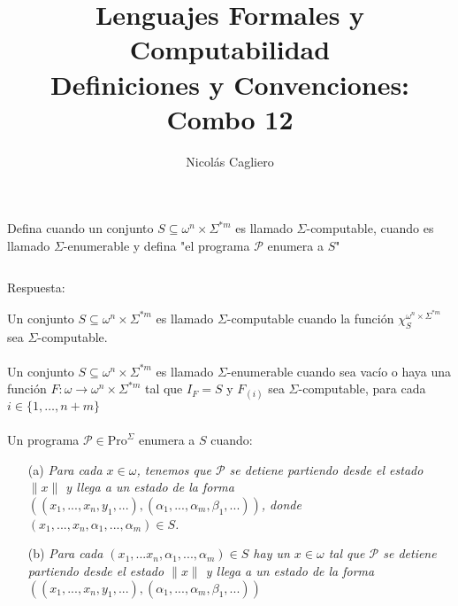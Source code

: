 \documentclass{article}
\title{Lenguajes Formales y Computabilidad \\
        \large Definiciones y Convenciones: Combo 12 }
\author{Nicolás Cagliero}
\begin{document}
\maketitle

Defina cuando un conjunto $S \subseteq \omega^n \times \Sigma^{*m}$ es llamado
$\Sigma$-computable, cuando es llamado $\Sigma$-enumerable y defina 
"el programa $\mathcal{P}$ enumera a $S$"

\(\)
\begin{center}
    Respuesta: 
    \(\)
\end{center}

Un conjunto $S \subseteq \omega^n \times \Sigma^{*m}$ es llamado
$\Sigma$-computable cuando la función $\chi_S^{\omega^n \times \Sigma^{*m}}$ sea $\Sigma$-computable.\\
\\

Un conjunto $S \subseteq \omega^n \times \Sigma^{*m}$ es llamado $\Sigma$-enumerable
cuando sea vacío o haya una función $F : \omega \rightarrow \omega^n \times \Sigma^{*m}$
tal que $I_F = S$ y $F_{(i)}$ sea $\Sigma$-computable, para cada $i \in \{1, \dots, n + m\}$\\
\\

Un programa $\mathcal{P} \in \text{Pro}^{\Sigma}$  enumera a $S$ cuando:
\begin{itemize}
  \item[(a)] \textit{Para cada $x \in \omega$, tenemos que $\mathcal{P}$ se detiene partiendo desde el estado $\|x\|$ y llega a un estado de la forma $((x_1, ..., x_n, y_1, ...), (\alpha_1, ..., \alpha_m, \beta_1, ...))$, donde $(x_1, ..., x_n, \alpha_1, ..., \alpha_m) \in S$.}
  
  \item[(b)] \textit{Para cada $(x_1, ... x_n, \alpha_1, ..., \alpha_m) \in S$ hay un $x \in \omega$ tal que $\mathcal{P}$ se detiene partiendo desde el estado $\|x\|$ y llega a un estado de la forma}\\
  \textit{$((x_1, ..., x_n, y_1, ...), (\alpha_1, ..., \alpha_m, \beta_1, ...))$} 
\end{itemize}
\end{document}
